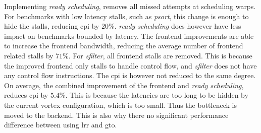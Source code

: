 Implementing \textit{ready scheduling}, removes all missed attempts at scheduling warps. For benchmarks with low latency stalls, such as \textit{psort}, this change is enough to hide the stalls, reducing \acrshort{cpi} by $20\%$. \textit{ready scheduling} does however have less impact on benchmarks bounded by latency. The frontend improvements are able to increase the frontend bandwidth, reducing the average number of frontend related stalls by $71\%$. For \textit{sfilter}, all frontend stalls are removed. This is because the improved frontend only stalls to handle control flow, and \textit{sfilter} does not have any control flow instructions. The \acrshort{cpi} is however not reduced to the same degree. On average, the combined improvement of the frontend and \textit{ready scheduling}, reduces \acrshort{cpi} by $5.4\%$. This is because the latencies are too long to be hidden by the current \Gls{vortex} configuration, which is too small. Thus the bottleneck is moved to the backend. This is also why there no significant performance difference between using \acrshort{lrr} and \acrshort{gto}.